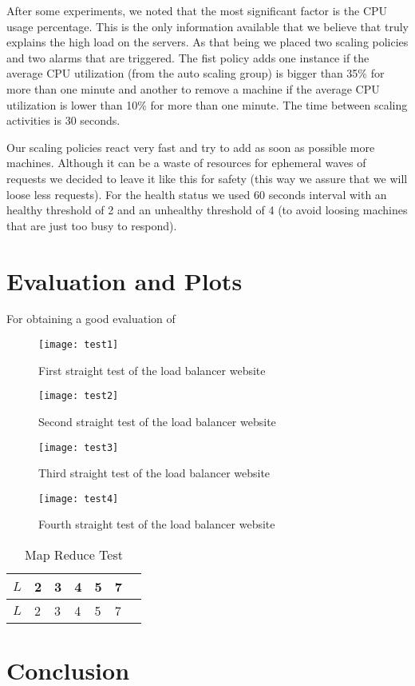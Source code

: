 \documentclass{article}
\begin{document}
After some experiments, we noted that the most significant factor is the CPU usage percentage. This is the only information available that we believe that truly explains the high load on the servers. As that being we placed two scaling policies and two alarms that are triggered. The fist policy adds one instance if the average CPU utilization (from the auto scaling group) is bigger than 35\% for more than one minute and another to remove a machine if the average CPU utilization is lower than 10\% for more than one minute. The time between scaling activities is 30 seconds.

Our scaling policies react very fast and try to add as soon as possible more machines. Although it can be a waste of resources for ephemeral waves of requests we decided to leave it like this for safety (this way we assure that we will loose less requests). For the health status we used 60 seconds interval with an healthy threshold of 2 and an unhealthy threshold of 4 (to avoid loosing machines that are just too busy to respond). 

\section{Evaluation and Plots}
For obtaining a good evaluation of 


\begin{figure}[H]
      \centering
      \texttt{[image: test1]}
      \caption{First straight test of the load balancer website}
      \label{load_balancer_test1}
\end{figure}
\begin{figure}[H]
      \centering
      \texttt{[image: test2]}
      \caption{Second straight test of the load balancer website}
      \label{load_balancer_test2}
\end{figure}
\begin{figure}[H]
      \centering
      \texttt{[image: test3]}
      \caption{Third straight test of the load balancer website}
      \label{load_balancer_test3}
\end{figure}
\begin{figure}[H]
      \centering
      \texttt{[image: test4]}
      \caption{Fourth straight test of the load balancer website}
      \label{load_balancer_test4}
\end{figure}
\begin{table}[htbp!]
\begin{center}
\caption{Map Reduce Test}
\begin{tabular}{*{7}{|l}|}
\hline
 $L$ & 2 & 3 & 4 & 5 & 7 \\ \hline
 $L$ & 2 & 3 & 4 & 5 & 7 \\ \hline
\end{tabular}
\end{center}
\label{map_reduce_test}
\end{table}
\section{Conclusion}
\end{document}
